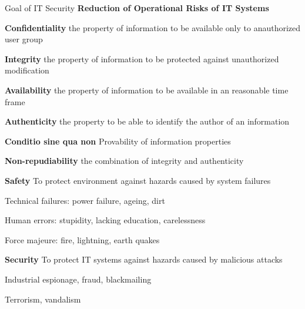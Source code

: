 \documentclass[a4paper]{article}
\begin{document}
\raggedright
\begin{multicols}{3}\scriptsize
    \setlength{\premulticols}{1pt}
    \setlength{\postmulticols}{1pt}
    \setlength{\multicolsep}{1pt}
    \setlength{\columnsep}{2pt}

    Goal of IT Security \textbf{Reduction of Operational Risks of IT Systems}
    \begin{itemize*}
        \item \textbf{Confidentiality} the property of information to be available only to anauthorized user group
        \item \textbf{Integrity} the property of information to be protected against unauthorized modification
        \item \textbf{Availability} the property of information to be available in an reasonable time frame
        \item \textbf{Authenticity} the property to be able to identify the author of an information
        \item \textbf{Conditio sine qua non} Provability of information properties
        \item \textbf{Non-repudiability} the combination of integrity and authenticity
        \item \textbf{Safety} To protect environment against hazards caused by system failures
        \begin{itemize*}
            \item Technical failures: power failure, ageing, dirt
            \item Human errors: stupidity, lacking education, carelessness
            \item Force majeure: fire, lightning, earth quakes
        \end{itemize*}
        \item \textbf{Security} To protect IT systems against hazards caused by malicious attacks
        \begin{itemize*}
            \item Industrial espionage, fraud, blackmailing
            \item Terrorism, vandalism
        \end{itemize*}
    \end{itemize*}


\end{multicols}
\end{document}
